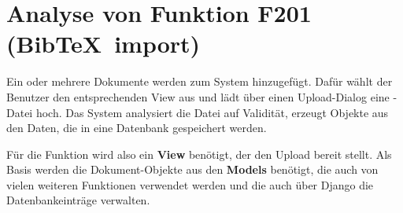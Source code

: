 \section{Analyse von Funktion F201 (Bib\TeX\ import)}
Ein oder mehrere Dokumente werden zum System hinzugefügt. Dafür wählt der
Benutzer den entsprechenden View aus und lädt über einen Upload-Dialog eine
\BibTeX -Datei hoch. Das System analysiert die Datei auf Validität, erzeugt
Objekte aus den Daten, die in eine Datenbank gespeichert werden.

Für die Funktion wird also ein \textbf{View} benötigt, der den Upload bereit
stellt.  Als Basis werden die Dokument-Objekte aus den \textbf{Models} benötigt,
die auch von vielen weiteren Funktionen verwendet werden und die auch über
Django die Datenbankeinträge verwalten.
